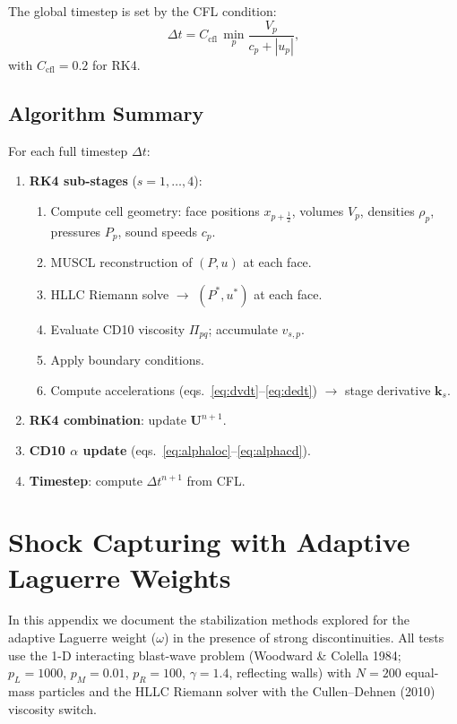 \documentclass[twocolumn]{aastex63}
\newcommand{\vel}{{u}}
\begin{document}
The global timestep is set by the CFL condition:
\begin{equation}
  \Delta t = C_\mathrm{cfl}\,\min_p
    \frac{V_p}{c_p + |\vel_p|},
\end{equation}
with $C_\mathrm{cfl} = 0.2$ for RK4.


\subsection{Algorithm Summary}

For each full timestep $\Delta t$:
\begin{enumerate}
  \item \textbf{RK4 sub-stages} ($s = 1,\ldots,4$):
    \begin{enumerate}[label=(\alph*)]
      \item Compute cell geometry:
            face positions $x_{p+\frac{1}{2}}$, volumes $V_p$,
            densities $\rho_p$, pressures $P_p$, sound speeds $c_p$.
      \item MUSCL reconstruction of $(P,\vel)$ at each face.
      \item HLLC Riemann solve $\rightarrow$ $(P^*,\vel^*)$ at each face.
      \item Evaluate CD10 viscosity $\Pi_{pq}$; accumulate $v_{s,p}$.
      \item Apply boundary conditions.
      \item Compute accelerations (eqs.~\ref{eq:dvdt}--\ref{eq:dedt})
            $\rightarrow$ stage derivative $\mathbf{k}_s$.
    \end{enumerate}
  \item \textbf{RK4 combination}: update $\mathbf{U}^{n+1}$.
  \item \textbf{CD10 $\alpha$ update}
        (eqs.~\ref{eq:alphaloc}--\ref{eq:alphacd}).
  \item \textbf{Timestep}: compute $\Delta t^{n+1}$ from CFL.
\end{enumerate}


\section{Shock Capturing with Adaptive Laguerre Weights} \label{app:shockcap}

In this appendix we document the stabilization methods
explored for the adaptive Laguerre weight ($\omega$) in the
presence of strong discontinuities.
All tests use the 1-D interacting blast-wave problem
(Woodward \& Colella 1984; $p_L=1000$, $p_M=0.01$,
$p_R=100$, $\gamma=1.4$, reflecting walls) with $N=200$
equal-mass particles and the HLLC Riemann solver with
the Cullen--Dehnen (2010) viscosity switch.
\end{document}
